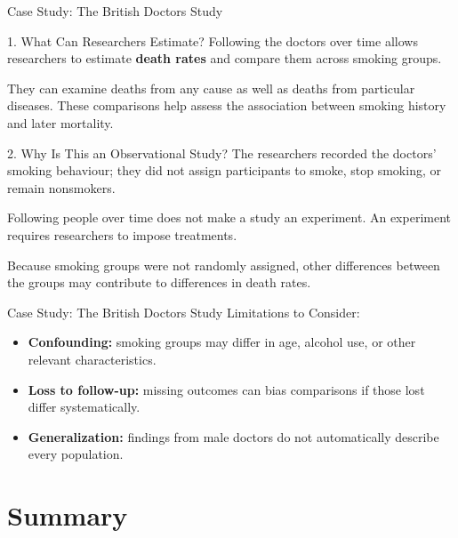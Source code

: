 \documentclass[aspectratio=169]{beamer}
\begin{document}
\begin{frame}{Case Study: The British Doctors Study}
\begin{block}{1. What Can Researchers Estimate?}
Following the doctors over time allows researchers to estimate \textbf{death rates} and compare them across smoking groups.

They can examine deaths from any cause as well as deaths from particular diseases. These comparisons help assess the association between smoking history and later mortality.
\end{block}

\begin{block}{2. Why Is This an Observational Study?}
The researchers recorded the doctors' smoking behaviour; they did not assign participants to smoke, stop smoking, or remain nonsmokers.

Following people over time does not make a study an experiment. An experiment requires researchers to impose treatments.
\end{block}

\small
Because smoking groups were not randomly assigned, other differences between the groups may contribute to differences in death rates.
\end{frame}

\begin{frame}{Case Study: The British Doctors Study}
Limitations to Consider:
\begin{itemize}
	\item \textbf{Confounding:} smoking groups may differ in age, alcohol use, or other relevant characteristics.
	\item \textbf{Loss to follow-up:} missing outcomes can bias comparisons if those lost differ systematically.
	\item \textbf{Generalization:} findings from male doctors do not automatically describe every population.
\end{itemize}
\end{frame}

\section{Summary}
\end{document}
